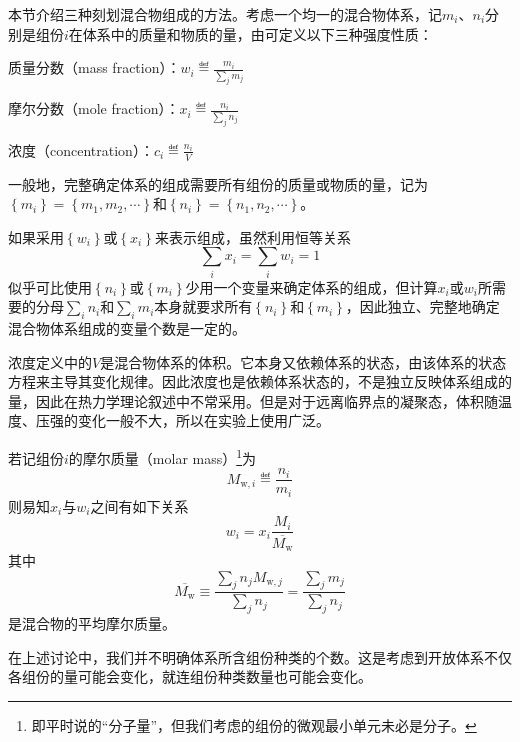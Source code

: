 \documentclass[main.tex]{subfiles}
\begin{document}
本节介绍三种刻划混合物组成的方法。考虑一个均一的混合物体系，记$m_i$、$n_i$分别是组份$i$在体系中的质量和物质的量，由可定义以下三种强度性质：

质量分数（mass fraction）：$w_i\eqdef\frac{m_i}{\sum_jm_j}$

摩尔分数（mole fraction）：$x_i\eqdef\frac{n_i}{\sum_jn_j}$

浓度（concentration）：$c_i\eqdef\frac{n_i}{V}$

一般地，完整确定体系的组成需要所有组份的质量或物质的量，记为$\left\{m_i\right\}=\left\{m_1,m_2,\cdots\right\}$和$\left\{n_i\right\}=\left\{n_1,n_2,\cdots\right\}$。

如果采用$\left\{w_i\right\}$或$\left\{x_i\right\}$来表示组成，虽然利用恒等关系
\[\sum_ix_i=\sum_iw_i=1\]
似乎可比使用$\left\{n_i\right\}$或$\left\{m_i\right\}$少用一个变量来确定体系的组成，但计算$x_i$或$w_i$所需要的分母$\sum_in_i$和$\sum_im_i$本身就要求所有$\left\{n_i\right\}$和$\left\{m_i\right\}$，因此独立、完整地确定混合物体系组成的变量个数是一定的。

浓度定义中的$V$是混合物体系的体积。它本身又依赖体系的状态，由该体系的状态方程来主导其变化规律。因此浓度也是依赖体系状态的，不是独立反映体系组成的量，因此在热力学理论叙述中不常采用。但是对于远离临界点的凝聚态，体积随温度、压强的变化一般不大，所以在实验上使用广泛。

若记组份$i$的摩尔质量（molar mass）\footnote{即平时说的“分子量”，但我们考虑的组份的微观最小单元未必是分子。}为
\[M_{\text{w},i}\eqdef\frac{n_i}{m_i}\]
则易知$x_i$与$w_i$之间有如下关系
\[w_i=x_i\frac{M_i}{\overline{M_\text{w}}}\]
其中
\[\overline{M_\text{w}}\equiv\frac{\sum_jn_jM_{\text{w},j}}{\sum_jn_j}=\frac{\sum_jm_j}{\sum_jn_j}\]
是混合物的平均摩尔质量。

在上述讨论中，我们并不明确体系所含组份种类的个数。这是考虑到开放体系不仅各组份的量可能会变化，就连组份种类数量也可能会变化。
\end{document}
